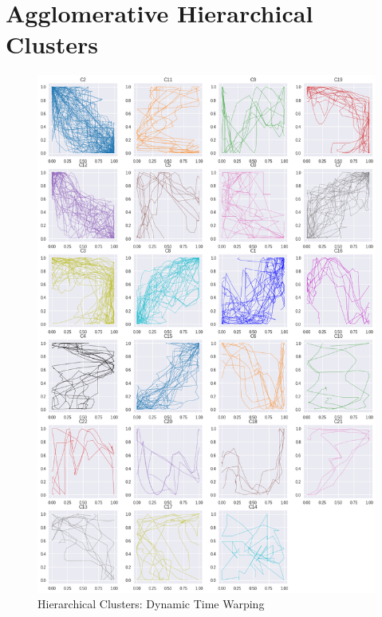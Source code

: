 \chapter{Agglomerative Hierarchical Clusters}
\label{app:h-clu}

\begin{figure}[h]
  \centering
  \includegraphics[width=\linewidth,height=\textheight,keepaspectratio]{figs/clusters/CLU_H_ALL[DTW].png}
  \caption{ Hierarchical Clusters: Dynamic Time Warping}
\end{figure}


